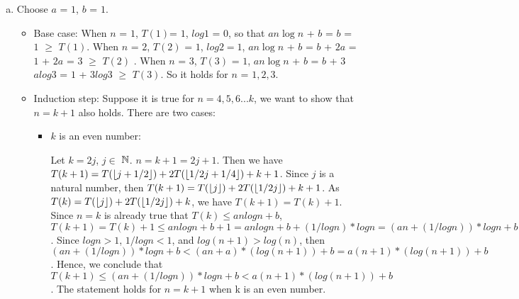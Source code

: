 \documentclass[11pt]{article}
\begin{document}
\begin{solution}
\item
\begin{enumerate}[(a)]
\item
    Choose $a$ = $1$, $b$ = $1$.
\begin{itemize}
\item
Base case: When $n$ = $1$, $T(1)$= $1$, $log 1$ = $0$, so that $a n \log n$ + $b$ = $b$ = $1$ $\ge$  $T(1)$. When $n$ = $2$, $T(2)$ = $1$, $log 2 = 1$, $a n \log n$ + $b$ = $b$ + $2$$a$ = $1$ + $2$$a$ = $3$ $\ge$ $T(2)$ . When $n$ = $3$, $T(3)$ = $1$, $a n \log n$ + $b$ = $b$ + $3$$alog3$ = $1$ + $3$$log3$ $\ge$ $T(3)$. So it holds for $n$ = $1, 2, 3$.
    
\item 
Induction step: Suppose it is true for $n = 4, 5, 6 ... k$, we want to show that $n = k+1$ also holds. There are two cases:
\begin{itemize}
    \item $k$ is an even number: 
    \begin{itemize}
        Let $k = 2j$, $j \in $ $\mathbb{N}$. $n = k + 1 = 2j+1$. Then we have $T(k+1) = T(\lfloor j+1/2 \rfloor) + 2T(\lfloor 1/2j+1/4 \rfloor) + k + 1$. 
        \newline
        \newline Since $j$ is a natural number, then $T(k+1) = T(\lfloor j \rfloor) + 2T(\lfloor 1/2j \rfloor) + k + 1$. As $T(k) = T(\lfloor j \rfloor) + 2T(\lfloor 1/2j \rfloor) + k $, we have $T(k+1) = T(k)+1$. 
        \newline
        \newline Since $n = k$ is already true that $T(k) \le a nlogn + b$, $T(k+1) = T(k)+1 \le a nlogn + b + 1 = an logn + b + (1/logn) * logn = (an+ (1/logn)) * logn +b$. 
        \newline
        \newline Since $logn > 1$, $1/logn < 1$, and $log(n+1) > log (n)$, then $(an+ (1/logn)) * logn +b < (an + a) * (log(n+1)) + b = a(n+1) * (log (n+1)) + b$. 
        \newline
        \newline Hence, we conclude that $T(k+1) \le (an+ (1/logn)) * logn +b < a(n+1) * (log (n+1)) + b$. The statement holds for $n = k + 1$ when k is an even number.
        

\end{itemize}
\end{itemize}
\end{itemize}
\end{enumerate}
\end{solution}
\end{document}
